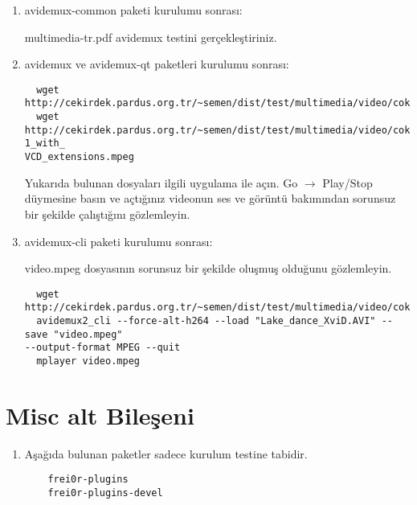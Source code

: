 \documentclass[a4paper,10pt]{article}
\begin{document}
\begin{enumerate}
 \item avidemux-common paketi kurulumu sonrası:

 multimedia-tr.pdf avidemux testini gerçekleştiriniz.

 \item avidemux ve avidemux-qt paketleri kurulumu sonrası:

\begin{verbatim}
  wget http://cekirdek.pardus.org.tr/~semen/dist/test/multimedia/video/cokluortam/Lake_dance_XviD.AVI
  wget http://cekirdek.pardus.org.tr/~semen/dist/test/multimedia/video/cokluortam/MPEG-1_with_
VCD_extensions.mpeg
\end{verbatim}
Yukarıda bulunan dosyaları ilgili uygulama ile açın. Go $\rightarrow$ Play/Stop düymesine basın ve açtığınız videonun ses ve görüntü bakımından sorunsuz bir şekilde çalıştığını gözlemleyin.
\item avidemux-cli paketi kurulumu sonrası:

video.mpeg dosyasının sorunsuz bir şekilde oluşmuş olduğunu gözlemleyin.
\begin{verbatim}
  wget http://cekirdek.pardus.org.tr/~semen/dist/test/multimedia/video/cokluortam/Lake_dance_XviD.AVI
  avidemux2_cli --force-alt-h264 --load "Lake_dance_XviD.AVI" --save "video.mpeg" 
--output-format MPEG --quit 
  mplayer video.mpeg
\end{verbatim}

\end{enumerate}

\section{Misc alt Bileşeni}

\begin{enumerate}
 \item Aşağıda bulunan paketler sadece kurulum testine tabidir. 

   \begin{verbatim}
    frei0r-plugins
    frei0r-plugins-devel
   \end{verbatim}

\end{enumerate}
\end{document}
